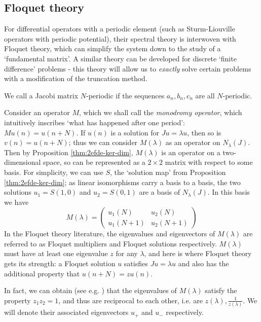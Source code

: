 \documentclass[../main.tex]{subfiles}
\begin{document}
\subsection{Floquet theory}
For differential operators with a periodic element
(such as Sturm-Liouville operators with periodic potential), their spectral
theory is interwoven with Floquet theory, which can simplify the system down to
the study of a `fundamental matrix'. A similar theory can be developed for
discrete `finite difference' problems - this theory will allow us to
\emph{exactly} solve certain problems with a modification of the truncation
method.

We call a Jacobi matrix $N$-periodic if the sequences $a_n, b_n, c_n$ are all
$N$-periodic.

Consider an operator $M$, which we shall call the \emph{monodromy
operator}, which intuitively inscribes `what has
happened after one period': $Mu(n) = u(n+N)$. If $u(n)$ is a solution for $Ju =
\lambda u$, then so is $v(n) = u(n+N)$; thus we can consider $M(\lambda)$ as an
operator on $N_\lambda (J)$. Then by Proposition \ref{thm:2efde-ker-dim},
$M(\lambda)$ is an operator on a two-dimensional space, so can be represented as
a $2 \times 2$ matrix with respect to some basis. For simplicity, we can use
$S$, the `solution map' from Proposition \ref{thm:2efde-ker-dim}; as linear
isomorphisms carry a basis to a basis, the two solutions $u_1 = S(1, 0)$ and
$u_2 = S(0, 1)$ are a basis of $N_\lambda (J)$. In this basis we have
  $$
  M(\lambda) =
  \begin{pmatrix}
    u_1(N) & u_2(N) \\
    u_1(N+1) & u_2(N+1)
  \end{pmatrix}
  $$
In the Floquet theory literature, the eigenvalues and eigenvectors of
$M(\lambda)$ are referred to as Floquet multipliers and Floquet solutions
respectively. $M(\lambda)$ must have at least one eigenvalue $z$ for any
$\lambda$, and here is where Floquet theory gets its strength: a Floquet
solution $u$ satisfies $Ju = \lambda u$ and also has the additional property
that $u(n+N) = zu(n).$

In fact, we can obtain (see e.g. \cite{teschl2000jacobi}) that the eigenvalues
of $M(\lambda)$ satisfy the property $z_1 z_2 = 1$, and thus are reciprocal to
each other, i.e. are $z(\lambda), \frac{1}{z(\lambda)}$. We will denote their
associated eigenvectors $u_+$ and $u_-$ respectively.
\end{document}
